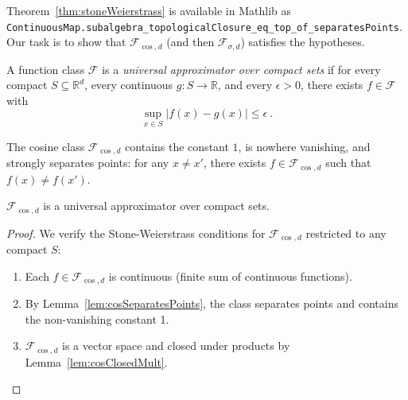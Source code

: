 \begin{remark}
  Theorem~\ref{thm:stoneWeierstrass} is available in Mathlib as \texttt{ContinuousMap.subalgebra\_topologicalClosure\_eq\_top\_of\_separatesPoints}.
  Our task is to show that $\mathcal{F}_{\cos,d}$ (and then $\mathcal{F}_{\sigma,d}$) satisfies the hypotheses.
\end{remark}

\begin{definition}\label{def:universalApprox}
A function class $\mathcal{F}$ is a \emph{universal approximator over compact sets} if for every compact $S \subseteq \mathbb{R}^d$, every continuous $g : S \to \mathbb{R}$, and every $\epsilon > 0$, there exists $f \in \mathcal{F}$ with
\[
  \sup_{x \in S} |f(x) - g(x)| \le \epsilon
  \: .
\]
\end{definition}

\begin{lemma}\label{lem:cosSeparatesPoints}
The cosine class $\mathcal{F}_{\cos,d}$ contains the constant $1$, is nowhere vanishing, and strongly separates points: for any $x \ne x'$, there exists $f \in \mathcal{F}_{\cos,d}$ such that $f(x) \ne f(x')$.
\end{lemma}

\begin{lemma}\label{lem:cosUniversal}
$\mathcal{F}_{\cos,d}$ is a universal approximator over compact sets.
\end{lemma}

\begin{proof}
  We verify the Stone-Weierstrass conditions for $\mathcal{F}_{\cos,d}$ restricted to any compact $S$:
  \begin{enumerate}
    \item Each $f \in \mathcal{F}_{\cos,d}$ is continuous (finite sum of continuous functions).
    \item By Lemma~\ref{lem:cosSeparatesPoints}, the class separates points and contains the non-vanishing constant 1.
    \item $\mathcal{F}_{\cos,d}$ is a vector space and closed under products by Lemma~\ref{lem:cosClosedMult}.
  \end{enumerate}
\end{proof}

